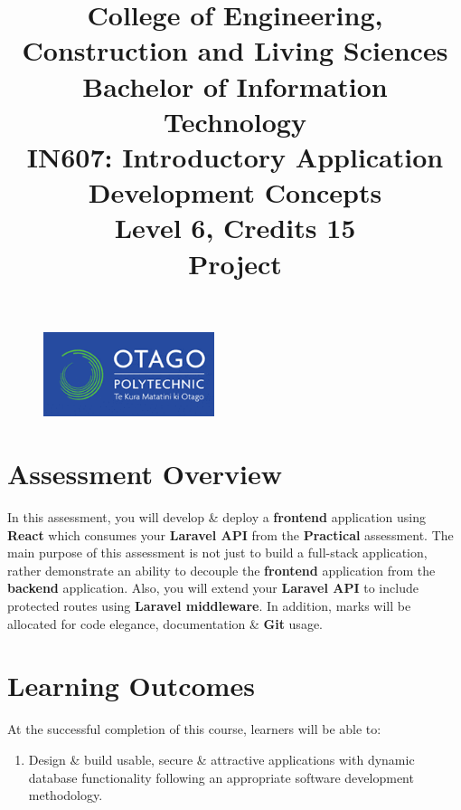 \documentclass{article}
\author{}
\begin{document}
\begin{figure}
	\centering
	\includegraphics[width=50mm]{./img/logo.png}
\end{figure}

\title{College of Engineering, Construction and Living Sciences\\Bachelor of Information Technology\\IN607: Introductory Application Development Concepts\\Level 6, Credits 15\\\textbf{Project}}
\date{}
\maketitle

\section*{Assessment Overview}
In this assessment, you will develop \& deploy a \textbf{frontend} application using \textbf{React} which consumes your \textbf{Laravel API} from the \textbf{Practical} assessment. The main purpose of this assessment is not just to build a full-stack application, rather demonstrate an ability to decouple the \textbf{frontend} application from the \textbf{backend} application. Also, you will extend your \textbf{Laravel API} to include protected routes using \textbf{Laravel middleware}. In addition, marks will be allocated for code elegance, documentation \& \textbf{Git} usage.

\section*{Learning Outcomes}
At the successful completion of this course, learners will be able to:
\begin{enumerate}
	\item Design \& build usable, secure \& attractive applications with dynamic database functionality following an appropriate software development methodology.
\end{enumerate}
\end{document}
